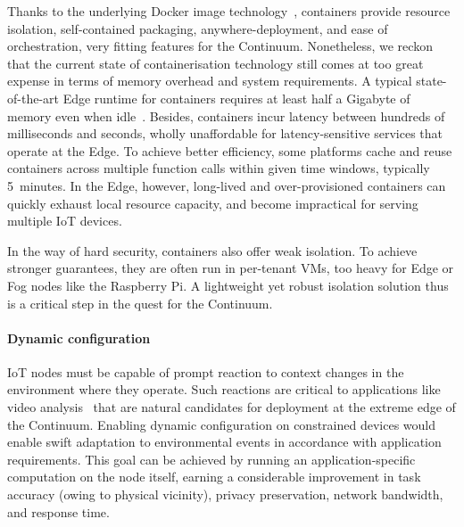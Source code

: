 Thanks to the underlying Docker image technology~\cite{docker-image}, containers provide resource isolation, self-contained packaging, anywhere-deployment, and ease of orchestration, very fitting features for the Continuum.
Nonetheless, we reckon that the current state of containerisation technology still comes at too great expense in terms of memory overhead and system requirements. A typical state-of-the-art Edge runtime for containers requires at least half a Gigabyte of memory even when idle~\cite{bohm2021profiling}. Besides, containers incur latency between hundreds of milliseconds and seconds, wholly unaffordable for latency-sensitive services that operate at the Edge. 
To achieve better efficiency, some platforms cache and reuse containers across multiple function calls within given time windows, typically 5~minutes. 
In the Edge, however, long-lived and over-provisioned containers can quickly exhaust local resource capacity, and become impractical for serving multiple IoT devices. 

In the way of hard security, containers also offer weak isolation. To achieve stronger guarantees, they are often run in per-tenant VMs, too heavy for Edge or Fog nodes like the Raspberry Pi. 
A light\-weight yet robust isolation solution thus is a critical step in the quest for the Continuum.

\paragraph{Dynamic configuration}\label{p:dynamic-configuration}

IoT nodes must be capable of prompt reaction to context changes in the environment where they operate. Such reactions are critical to applications like video analysis~\cite{jang2018application} that are natural candidates for deployment at the extreme edge of the Continuum. 
Enabling dynamic configuration on constrained devices would enable swift adaptation to environmental events in accordance with application requirements. 
This goal can be achieved by running an application-specific computation on the node itself, earning a considerable improvement in task accuracy (owing to physical vicinity), privacy preservation, network bandwidth, and response time.


